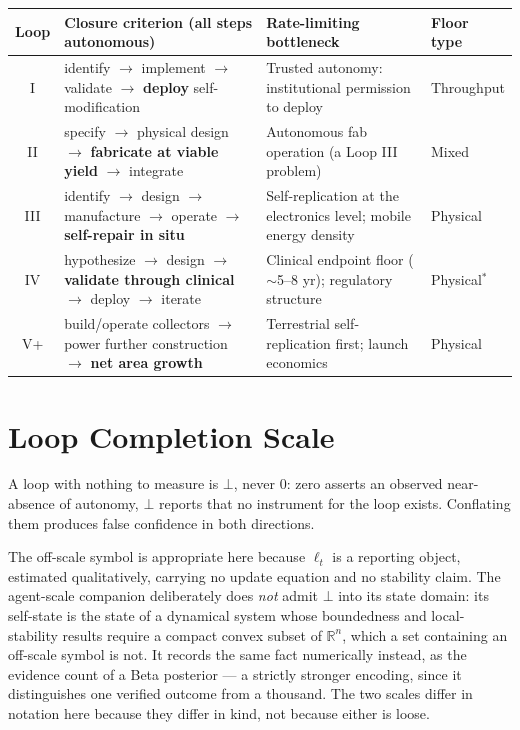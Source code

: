 \documentclass[11pt]{article}
\begin{document}
\begin{table}[h]
\centering
\footnotesize
\begin{tabular}{@{}cL{5.4cm}L{4.4cm}l@{}}
\toprule
Loop & Closure criterion (all steps autonomous) & Rate-limiting bottleneck & Floor type \\
\midrule
I & identify $\to$ implement $\to$ validate $\to$ \textbf{deploy} self-modification & Trusted autonomy: institutional permission to deploy & Throughput \\
II & specify $\to$ physical design $\to$ \textbf{fabricate at viable yield} $\to$ integrate & Autonomous fab operation (a Loop III problem) & Mixed \\
III & identify $\to$ design $\to$ manufacture $\to$ operate $\to$ \textbf{self-repair in situ} & Self-replication at the electronics level; mobile energy density & Physical \\
IV & hypothesize $\to$ design $\to$ \textbf{validate through clinical} $\to$ deploy $\to$ iterate & Clinical endpoint floor ($\sim$5--8 yr); regulatory structure & Physical$^{*}$ \\
V+ & build/operate collectors $\to$ power further construction $\to$ \textbf{net area growth} & Terrestrial self-replication first; launch economics & Physical \\
\bottomrule
\end{tabular}
\end{table}

\section{Loop Completion Scale}
\label{app:scale}

\noindent A loop with nothing to measure is $\bot$, never $0$: zero asserts an observed near-absence of autonomy, $\bot$ reports that no instrument for the loop exists. Conflating them produces false confidence in both directions.

The off-scale symbol is appropriate here because $\ell_t$ is a reporting object, estimated qualitatively, carrying no update equation and no stability claim. The agent-scale companion \citep{yang2026selfaware} deliberately does \emph{not} admit $\bot$ into its state domain: its self-state is the state of a dynamical system whose boundedness and local-stability results require a compact convex subset of $\mathbb{R}^n$, which a set containing an off-scale symbol is not. It records the same fact numerically instead, as the evidence count of a Beta posterior --- a strictly stronger encoding, since it distinguishes one verified outcome from a thousand. The two scales differ in notation here because they differ in kind, not because either is loose.
\end{document}
